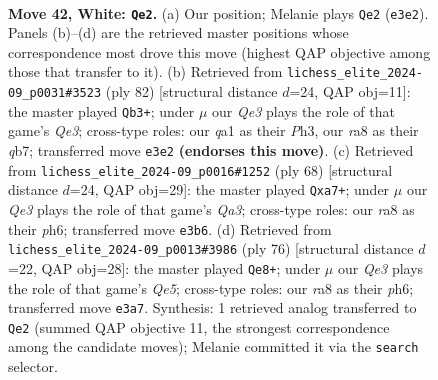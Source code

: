 \documentclass[11pt]{article}
\begin{document}
\clearpage

\begin{figure}[p]\centering
\begin{subfigure}{0.46\textwidth}\centering
\resizebox{\linewidth}{!}{%
\newchessgame
\chessboard[
  setfen={r7/5k2/5p2/3p4/5P2/p3Q1P1/P5KP/q7 w - - 3 42},
  showmover=false,
  pgfstyle=straightmove, color=movearrow, markmove={e3-e2}
]}
\caption{}
\end{subfigure}\hfill
\begin{subfigure}{0.46\textwidth}\centering
\resizebox{\linewidth}{!}{%
\newchessgame
\chessboard[
  setfen={8/1q3kp1/pp5p/8/P7/4Q1PP/5P1K/8 w - - 6 42},
  showmover=false,
  pgfstyle=straightmove, color=movearrow, markmove={e3-b3}
]}
\caption{}
\end{subfigure}
\\[4pt]
\begin{subfigure}{0.46\textwidth}\centering
\resizebox{\linewidth}{!}{%
\newchessgame
\chessboard[
  setfen={8/p4k2/4pp1p/8/8/Q6P/P4PPK/1q6 w - - 2 35},
  showmover=false,
  pgfstyle=straightmove, color=movearrow, markmove={a3-a7}
]}
\caption{}
\end{subfigure}\hfill
\begin{subfigure}{0.46\textwidth}\centering
\resizebox{\linewidth}{!}{%
\newchessgame
\chessboard[
  setfen={6k1/5p2/6pp/4Q3/p7/P2qP2P/5PP1/6K1 w - - 3 39},
  showmover=false,
  pgfstyle=straightmove, color=movearrow, markmove={e5-e8}
]}
\caption{}
\end{subfigure}
\caption{\textbf{Move 42, White: \texttt{Qe2}.} (a) Our position; Melanie plays \texttt{Qe2} (\texttt{e3e2}). Panels (b)--(d) are the retrieved master positions whose correspondence most drove this move (highest QAP objective among those that transfer to it). (b) Retrieved from \texttt{lichess\_elite\_2024-09\_p0031\#3523} (ply 82) [structural distance $d$=24, QAP obj=11]: the master played \texttt{Qb3+}; under $\mu$ our \emph{Qe3} plays the role of that game's \emph{Qe3}; cross-type roles: our \emph{q}a1 as their \emph{P}h3, our \emph{r}a8 as their \emph{q}b7; transferred move \texttt{e3e2} \textbf{(endorses this move)}. (c) Retrieved from \texttt{lichess\_elite\_2024-09\_p0016\#1252} (ply 68) [structural distance $d$=24, QAP obj=29]: the master played \texttt{Qxa7+}; under $\mu$ our \emph{Qe3} plays the role of that game's \emph{Qa3}; cross-type roles: our \emph{r}a8 as their \emph{p}h6; transferred move \texttt{e3b6}. (d) Retrieved from \texttt{lichess\_elite\_2024-09\_p0013\#3986} (ply 76) [structural distance $d$=22, QAP obj=28]: the master played \texttt{Qe8+}; under $\mu$ our \emph{Qe3} plays the role of that game's \emph{Qe5}; cross-type roles: our \emph{r}a8 as their \emph{p}h6; transferred move \texttt{e3a7}. Synthesis: 1 retrieved analog transferred to \texttt{Qe2} (summed QAP objective 11, the strongest correspondence among the candidate moves); Melanie committed it via the \texttt{search} selector.}
\label{fig:thought-m82}
\end{figure}
\end{document}
